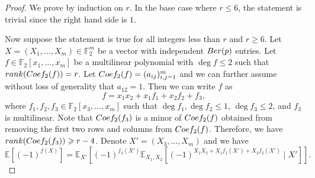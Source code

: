 \documentclass[10pt,a4paper]{amsart}
\newcommand{\Ber}{\textup{Ber}}
\newcommand{\Coef}{\textup{Coef}}
\newcommand{\EE}{\mathbb E}
\newcommand{\F}{\mathbb{F}}
\newcommand{\FF}{\mathbb F}
\renewcommand{\ge}{\geqslant}
\renewcommand{\geq}{\ge}
\renewcommand{\le}{\leqslant}
\renewcommand{\leq}{\le}
\newcommand{\rank}{\textup{rank}}
\begin{document}
\begin{proof}
    We prove by induction on $r$. In the base case where $r\leq 6$, the statement is trivial since the right hand side is $1$.

    Now suppose the statement is true for all integers less than $r$ and $r\geq 6$. Let $X=(X_1,\dots,X_m)\in \F_2^m$ be a vector with independent $\Ber(p)$ entries.
    Let $f\in\FF_2[x_1,\dots,x_m]$ be a multilinear polynomial with $\deg f\leq 2$ such that $\rank(\Coef_2(f))=r$. Let $\Coef_2(f)=(a_{ij})_{i,j=1}^m$ and we can further assume without loss of generality that $a_{12}=1$. Then we can write $f$ as
    \[f=x_1x_2+x_1f_1+x_2f_2+f_3,\]
    where $f_1,f_2,f_3\in \FF_2[x_3,\dots,x_m]$ such that $\deg f_1,\deg f_2\leq 1$, $\deg f_3\leq 2$, and $f_3$ is multilinear. Note that $\Coef_2(f_3)$ is a minor of $\Coef_2(f)$ obtained from removing the first two rows and columns from $\Coef_2(f)$. Therefore, we have $\rank(\Coef_2(f_3))\geq r-4$. Denote $X'=(X_3,\dots,X_m)$ and we have 
    \[\EE[(-1)^{f(X)}] = \EE_{X'}\left[(-1)^{f_3(X')}\EE_{X_1,X_2}[(-1)^{X_1X_2+X_1f_1(X')+X_2f_2(X')}\mid X']\right].\]


\end{proof}
\end{document}
